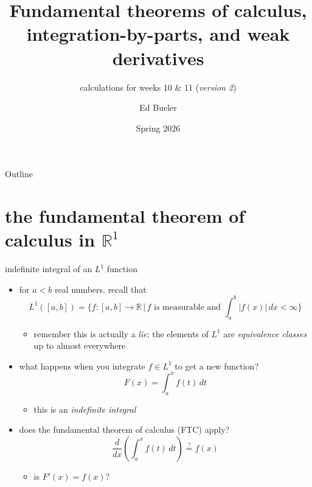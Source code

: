 \documentclass[10pt,
               svgnames,
               hyperref={colorlinks,
                         citecolor=DeepPink4,
                         linkcolor=FireBrick,
                         urlcolor=blue},
               usepdftitle=false]{beamer}
\title[FTCs, IBP, and weak derivatives]{Fundamental theorems of calculus, integration-by-parts, and weak derivatives}
\subtitle{calculations for weeks 10 \& 11 \quad (\emph{version 2})}
\author{Ed Bueler}
\institute[]{UAF Math 617 Functional Analysis}
\date{Spring 2026}
\newcommand{\RR}{\mathbb{R}}
\begin{document}
\beamertemplatenavigationsymbolsempty

\begin{frame}
  \maketitle
\end{frame}


\begin{frame}{Outline}
  \tableofcontents[hideallsubsections]
\end{frame}

\AtBeginSection[]
{%
}


\section{the fundamental theorem of calculus in $\RR^1$}

\begin{frame}{indefinite integral of an $L^1$ function}

\begin{itemize}
\item for $a<b$ real numbers, recall that
	$$L^1([a,b]) = \Big\{f:[a,b]\to\RR\,\big|\,f \text{ is measurable and } \int_a^b |f(x)|\,dx <\infty\Big\}$$

    \begin{itemize}
    \item[$\circ$] remember this is actually a \emph{lie}; the elements of $L^1$ are \emph{equivalence classes} up to almost everywhere
    \end{itemize}
\item what happens when you integrate $f\in L^1$ to get a new function?
	$$F(x) = \int_a^x f(t)\,dt$$

    \begin{itemize}
    \item[$\circ$] this is an \emph{indefinite integral}
    \end{itemize}
\item does the fundamental theorem of calculus (FTC) apply?
	$$\frac{d}{dx}\left(\int_a^x f(t)\,dt\right) \stackrel{?}{=} f(x)$$

    \begin{itemize}
    \item[$\circ$] is $F'(x)=f(x)$?
    \end{itemize}
\end{itemize}
\end{frame}
\end{document}

